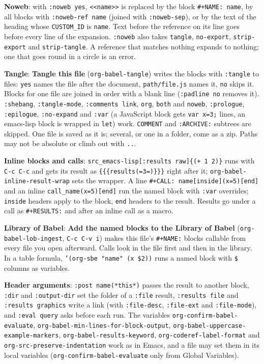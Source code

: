 \documentclass[11pt]{article}
\begin{document}
\textbf{Noweb}: with \texttt{:noweb yes}, \texttt{<{}<{}name>{}>{}} is replaced by the block \texttt{\#+NAME: name}, by all blocks with \texttt{:noweb-ref name} (joined with \texttt{:noweb-sep}), or by the text of the heading whose \texttt{CUSTOM\_ID} is \texttt{name}. Text before the reference on its line goes before every line of the expansion. \texttt{:noweb} also takes \texttt{tangle}, \texttt{no-export}, \texttt{strip-export} and \texttt{strip-tangle}. A reference that matches nothing expands to nothing; one that goes round in a circle is an error.

\textbf{Tangle}: \textbf{Tangle this file} (\texttt{org-babel-tangle}) writes the blocks with \texttt{:tangle} to files: \texttt{yes} names the file after the document, \texttt{path/file.js} names it, \texttt{no} skips it. Blocks for one file are joined in order with a blank line (\texttt{:padline no} removes it). \texttt{:shebang}, \texttt{:tangle-mode}, \texttt{:comments link}, \texttt{org}, \texttt{both} and \texttt{noweb}, \texttt{:prologue}, \texttt{:epilogue}, \texttt{:no-expand} and \texttt{:var} (a JavaScript block gets \texttt{var x=3;} lines, an emacs-lisp block is wrapped in \texttt{let}) work. \texttt{COMMENT} and \texttt{:ARCHIVE:} subtrees are skipped. One file is saved as it is; several, or one in a folder, come as a zip. Paths may not be absolute or climb out with \texttt{..}.

\textbf{Inline blocks and calls}: \texttt{src\_emacs-lisp[:results raw]\{(+ 1 2)\}} runs with \texttt{C-c C-c} and gets its result as \texttt{\{\{\{results(=3=)\}\}\}} right after it; \texttt{org-babel-inline-result-wrap} sets the wrapper. A line \texttt{\#+CALL: name[inside](x=5)[end]} and an inline \texttt{call\_name(x=5)[end]} run the named block with \texttt{:var} overrides; \texttt{inside} headers apply to the block, \texttt{end} headers to the result. Results go under a call as \texttt{\#+RESULTS:} and after an inline call as a macro.

\textbf{Library of Babel}: \textbf{Add the named blocks to the Library of Babel} (\texttt{org-babel-lob-ingest}, \texttt{C-c C-v i}) makes this file's \texttt{\#+NAME:} blocks callable from every file you open afterward. Calls look in the file first and then in the library. In a table formula, \texttt{'(org-sbe "name" (x \$2))} runs a named block with \texttt{\$} columns as variables.

\textbf{Header arguments}: \texttt{:post name(*this*)} passes the result to another block, \texttt{:dir} and \texttt{:output-dir} set the folder of a \texttt{:file} result, \texttt{:results file} and \texttt{:results graphics} write a link (with \texttt{:file-desc}, \texttt{:file-ext} and \texttt{:file-mode}), and \texttt{:eval query} asks before each run. The variables \texttt{org-confirm-babel-evaluate}, \texttt{org-babel-min-lines-for-block-output}, \texttt{org-babel-uppercase-example-markers}, \texttt{org-babel-results-keyword}, \texttt{org-coderef-label-format} and \texttt{org-src-preserve-indentation} work as in Emacs, and a file may set them in its local variables (\texttt{org-confirm-babel-evaluate} only from Global Variables).
\end{document}
